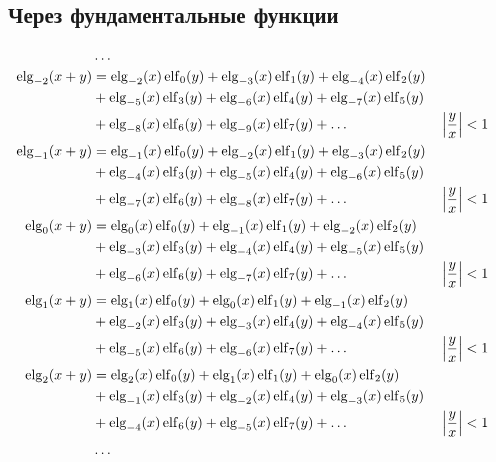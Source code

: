 
\subsection{Через фундаментальные функции}

\begin{equation*} \begin{aligned}
&\ldots \\
%
\elg_{-2}(x + y) &=   
  \elg_{-2}(x) \elf_0(y)
+ \elg_{-3}(x) \elf_1(y)  
+ \elg_{-4}(x) \elf_2(y) \\ &
+ \elg_{-5}(x) \elf_3(y)
+ \elg_{-6}(x) \elf_4(y)
+ \elg_{-7}(x) \elf_5(y) \\ &
+ \elg_{-8}(x) \elf_6(y)
+ \elg_{-9}(x) \elf_7(y)
+ \ldots & 
&\left| \frac{y}{x} \right| < 1 \\
%
\elg_{-1}(x + y) &=
  \elg_{-1}(x) \elf_0(y)
+ \elg_{-2}(x) \elf_1(y)  
+ \elg_{-3}(x) \elf_2(y) \\ &
+ \elg_{-4}(x) \elf_3(y)
+ \elg_{-5}(x) \elf_4(y)
+ \elg_{-6}(x) \elf_5(y) \\ &
+ \elg_{-7}(x) \elf_6(y)
+ \elg_{-8}(x) \elf_7(y)
+ \ldots & 
&\left| \frac{y}{x} \right| < 1 \\
%
\elg_0(x + y) &=
  \elg_0(x) \elf_0(y)
+ \elg_{-1}(x) \elf_1(y)  
+ \elg_{-2}(x) \elf_2(y) \\ &
+ \elg_{-3}(x) \elf_3(y)
+ \elg_{-4}(x) \elf_4(y)
+ \elg_{-5}(x) \elf_5(y) \\ &
+ \elg_{-6}(x) \elf_6(y)
+ \elg_{-7}(x) \elf_7(y)
+ \ldots & 
&\left| \frac{y}{x} \right| < 1 \\
%
\elg_1(x + y) &=
  \elg_1(x) \elf_0(y)
+ \elg_0(x) \elf_1(y)
+ \elg_{-1}(x) \elf_2(y) \\ &
+ \elg_{-2}(x) \elf_3(y)
+ \elg_{-3}(x) \elf_4(y)
+ \elg_{-4}(x) \elf_5(y) \\ &
+ \elg_{-5}(x) \elf_6(y)
+ \elg_{-6}(x) \elf_7(y)
+ \ldots & 
&\left| \frac{y}{x} \right| < 1 \\
%
\elg_2(x + y) &=
  \elg_2(x) \elf_0(y)
+ \elg_1(x) \elf_1(y)
+ \elg_0(x) \elf_2(y) \\ &
+ \elg_{-1}(x) \elf_3(y)
+ \elg_{-2}(x) \elf_4(y)
+ \elg_{-3}(x) \elf_5(y) \\ &
+ \elg_{-4}(x) \elf_6(y)
+ \elg_{-5}(x) \elf_7(y)
+ \ldots & 
&\left| \frac{y}{x} \right| < 1 \\
%
&\ldots \\
\end{aligned} \end{equation*}

